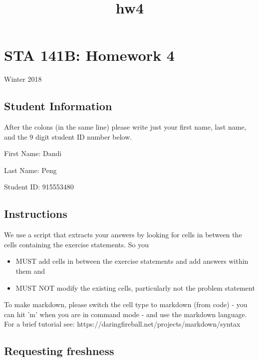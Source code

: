 \documentclass[11pt]{article}
\title{hw4}
\providecommand{\tightlist}{%
      \setlength{\itemsep}{0pt}\setlength{\parskip}{0pt}}
\begin{document}
    
    
    \maketitle
    
    

    
    \section{STA 141B: Homework 4}\label{sta-141b-homework-4}

Winter 2018

    \subsection{Student Information}\label{student-information}

After the colons (in the same line) please write just your first name,
last name, and the 9 digit student ID number below.

First Name: Dandi

Last Name: Peng

Student ID: 915553480

    \subsection{Instructions}\label{instructions}

We use a script that extracts your answers by looking for cells in
between the cells containing the exercise statements. So you

\begin{itemize}
\tightlist
\item
  MUST add cells in between the exercise statements and add answers
  within them and
\item
  MUST NOT modify the existing cells, particularly not the problem
  statement
\end{itemize}

To make markdown, please switch the cell type to markdown (from code) -
you can hit 'm' when you are in command mode - and use the markdown
language. For a brief tutorial see:
https://daringfireball.net/projects/markdown/syntax

    \subsection{Requesting freshness}\label{requesting-freshness}
\end{document}
